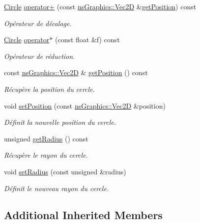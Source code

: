 \begin{DoxyCompactItemize}
\hyperlink{classns_shape_1_1_circle}{Circle} \hyperlink{classns_shape_1_1_circle_a8b1f88a61fb38c283b11600e4eec6fe3}{operator+} (const \hyperlink{classns_graphics_1_1_vec2_d}{ns\+Graphics\+::\+Vec2D} \&\hyperlink{classns_shape_1_1_circle_a85b4102c4a23101fba4f90c1f8e84168}{get\+Position}) const
\begin{DoxyCompactList}\small\item\em Opérateur de décalage. \end{DoxyCompactList}\item 
\hyperlink{classns_shape_1_1_circle}{Circle} \hyperlink{classns_shape_1_1_circle_ad34827f3120b9331389a00cbf02468cb}{operator$\ast$} (const float \&f) const
\begin{DoxyCompactList}\small\item\em Opérateur de réduction. \end{DoxyCompactList}\item 
const \hyperlink{classns_graphics_1_1_vec2_d}{ns\+Graphics\+::\+Vec2D} \& \hyperlink{classns_shape_1_1_circle_a85b4102c4a23101fba4f90c1f8e84168}{get\+Position} () const
\begin{DoxyCompactList}\small\item\em Récupère la position du cercle. \end{DoxyCompactList}\item 
void \hyperlink{classns_shape_1_1_circle_ac4e73227c9ec7e22670bd012b6f37bef}{set\+Position} (const \hyperlink{classns_graphics_1_1_vec2_d}{ns\+Graphics\+::\+Vec2D} \&position)
\begin{DoxyCompactList}\small\item\em Définit la nouvelle position du cercle. \end{DoxyCompactList}\item 
unsigned \hyperlink{classns_shape_1_1_circle_afcb275822a67ec49167fe122ab74872c}{get\+Radius} () const
\begin{DoxyCompactList}\small\item\em Récupère le rayon du cercle. \end{DoxyCompactList}\item 
void \hyperlink{classns_shape_1_1_circle_a5f20408e41621d21487b6162eabc3a7d}{set\+Radius} (const unsigned \&radius)
\begin{DoxyCompactList}\small\item\em Définit le nouveau rayon du cercle. \end{DoxyCompactList}\end{DoxyCompactItemize}
\subsection*{Additional Inherited Members}


